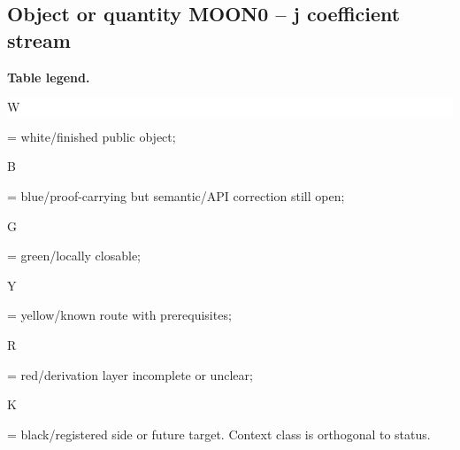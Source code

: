 \subsection*{Object or quantity MOON0 -- j coefficient stream}
\hypertarget{objproof:MOON0}{}
\par\smallskip\noindent\begin{minipage}{0.99\linewidth}\footnotesize\raggedright\textbf{Table legend.} \colorbox{white}{\strut W} = white/finished public object; \colorbox{cyan!20}{\strut B} = blue/proof-carrying but semantic/API correction still open; \colorbox{green!18}{\strut G} = green/locally closable; \colorbox{yellow!25}{\strut Y} = yellow/known route with prerequisites; \colorbox{red!20}{\strut R} = red/derivation layer incomplete or unclear; \colorbox{black!18}{\strut K} = black/registered side or future target. Context class is orthogonal to status.\end{minipage}\par\vspace{0.25em}
